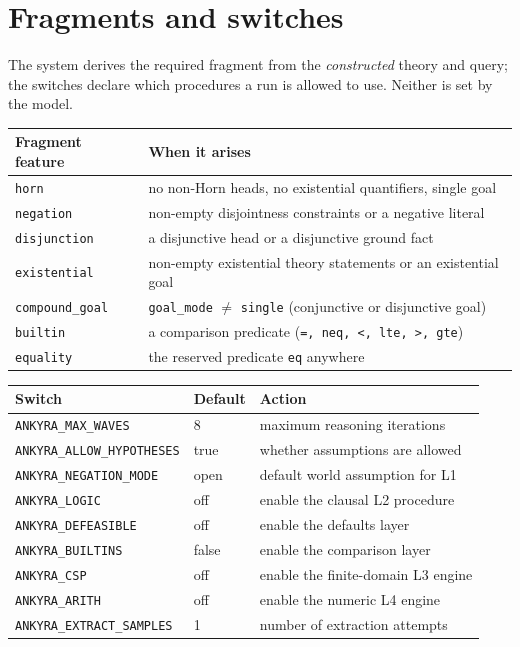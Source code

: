 \documentclass[11pt,a4paper]{article}
\begin{document}
\appendix

\section{Fragments and switches}
\label{app:fragments}

The system derives the required fragment from the \emph{constructed} theory and query; the
switches declare which procedures a run is allowed to use. Neither is set by the model.

\begin{center}
\begin{tabular}{lp{9.6cm}}
\toprule
\textbf{Fragment feature} & \textbf{When it arises} \\
\midrule
\texttt{horn} & no non-Horn heads, no existential quantifiers, single goal \\
\texttt{negation} & non-empty disjointness constraints or a negative literal \\
\texttt{disjunction} & a disjunctive head or a disjunctive ground fact \\
\texttt{existential} & non-empty existential theory statements or an existential goal \\
\texttt{compound\_goal} & \texttt{goal\_mode} $\neq$ \texttt{single} (conjunctive or disjunctive goal) \\
\texttt{builtin} & a comparison predicate (\texttt{=, neq, <, lte, >, gte}) \\
\texttt{equality} & the reserved predicate \texttt{eq} anywhere \\
\bottomrule
\end{tabular}
\end{center}

\begin{center}
\begin{tabular}{lll}
\toprule
\textbf{Switch} & \textbf{Default} & \textbf{Action} \\
\midrule
\texttt{ANKYRA\_MAX\_WAVES} & 8 & maximum reasoning iterations \\
\texttt{ANKYRA\_ALLOW\_HYPOTHESES} & true & whether assumptions are allowed \\
\texttt{ANKYRA\_NEGATION\_MODE} & open & default world assumption for L1 \\
\texttt{ANKYRA\_LOGIC} & off & enable the clausal L2 procedure \\
\texttt{ANKYRA\_DEFEASIBLE} & off & enable the defaults layer \\
\texttt{ANKYRA\_BUILTINS} & false & enable the comparison layer \\
\texttt{ANKYRA\_CSP} & off & enable the finite-domain L3 engine \\
\texttt{ANKYRA\_ARITH} & off & enable the numeric L4 engine \\
\texttt{ANKYRA\_EXTRACT\_SAMPLES} & 1 & number of extraction attempts \\
\bottomrule
\end{tabular}
\end{center}
\end{document}
